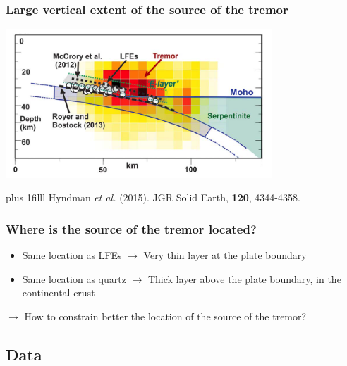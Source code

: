 \documentclass{beamer}
\newcommand{\btVFill}{\vskip0pt plus 1filll}
\begin{document}

	\begin{frame}
		\frametitle{Large vertical extent of the source of the tremor}
		\begin{center}
			\includegraphics[trim={0cm 0cm 0cm 0cm}, clip, width=10cm]{articles/hyndmann_al_2015_8b.png}
		\end{center}
		\btVFill
		\tiny{Hyndman \textit{et al.} (2015). JGR Solid Earth, \textbf{120}, 4344-4358.}
	\end{frame}

	\begin{frame}
		\frametitle{Where is the source of the tremor located?}
		\begin{itemize}
			\item Same location as LFEs $\rightarrow$ Very thin layer at the plate boundary
			\item Same location as quartz $\rightarrow$ Thick layer above the plate boundary, in the continental crust
		\end{itemize}

		\begin{block}{}
			$\rightarrow$ How to constrain better the location of the source of the tremor?
		\end{block}
	\end{frame}


	\subsection{Data}
\end{document}
